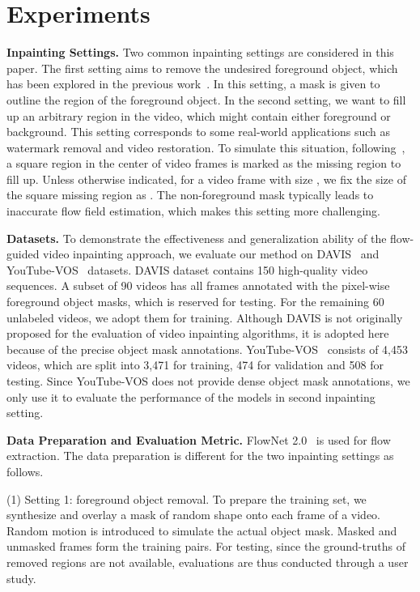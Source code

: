 \documentclass[10pt,twocolumn,letterpaper]{article}
\begin{document}
\section{Experiments}
\label{sec:experiments}
\noindent
\textbf{Inpainting Settings.}
Two common inpainting settings are considered in this paper.
The first setting aims to remove the undesired foreground object, which has been explored in the previous work~\cite{Huang-SigAsia-2016, newson2014video}.
In this setting, a mask is given to outline the region of the foreground object.
In the second setting, we want to fill up an arbitrary region in the video, which might contain either foreground or background. This setting corresponds to some real-world applications such as watermark removal and video restoration.
To simulate this situation, following~\cite{iizuka2017globally, yu2018generative}, a square region in the center of video frames is marked as the missing region to fill up. 
Unless otherwise indicated, for a video frame with size , we fix the size of the square missing region as .
The non-foreground mask typically leads to inaccurate flow field estimation, which makes this setting more challenging.

\noindent
\textbf{Datasets.}
To demonstrate the effectiveness and generalization ability of the flow-guided video inpainting approach, we evaluate our method on DAVIS~\cite{Perazzi2016} and YouTube-VOS~\cite{xu2018youtube} datasets.
DAVIS dataset contains 150 high-quality video sequences.
A subset of 90 videos has all frames annotated with the pixel-wise foreground object masks, which is reserved for testing.
For the remaining 60 unlabeled videos, we adopt them for training.
Although DAVIS is not originally proposed for the evaluation of video inpainting algorithms, it is adopted here because of the precise object mask annotations. 
YouTube-VOS~\cite{xu2018youtube} consists of 4,453 videos, which are split into 3,471 for training, 474 for validation and 508 for testing.
Since YouTube-VOS does not provide dense object mask annotations, we only use it to evaluate the performance of the models in second inpainting setting.


\noindent
\textbf{Data Preparation and Evaluation Metric.}
FlowNet 2.0~\cite{ilg2017flownet} is used for flow extraction. The data preparation is different for the two inpainting settings as follows. 

\noindent
(1) Setting 1: foreground object removal.
To prepare the training set, we synthesize and overlay a mask of random shape onto each frame of a video. Random motion is introduced to simulate the actual object mask. Masked and unmasked frames form the training pairs.
For testing, since the ground-truths of removed regions are not available, evaluations are thus conducted through a user study.
\end{document}
